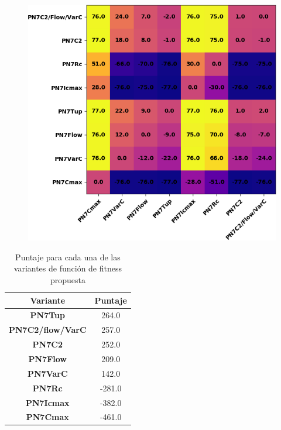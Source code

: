 \begin{figure}[h]
    \centering
    \includegraphics[scale=.8]{Imagenes/fitnesscomp.png}
    \label{fig:fcomp}
\end{figure}
\begin{table}[h]
    \centering
\begin{tabular}{@{}cc@{}}
Variante & Puntaje \\ \midrule
\toprule
    \textbf{PN7Tup} & 264.0 \\ \midrule
    \textbf{PN7C2/flow/VarC} & 257.0 \\ \midrule
    \textbf{PN7C2} & 252.0 \\ \midrule
    \textbf{PN7Flow} & 209.0 \\ \midrule
    \textbf{PN7VarC} & 142.0 \\ \midrule
    \textbf{PN7Rc} & -281.0 \\ \midrule
    \textbf{PN7Icmax} & -382.0 \\ \midrule
    \textbf{PN7Cmax} & -461.0 \\ \midrule
\end{tabular}
    \caption{Puntaje para cada una de las variantes de función de fitness propuesta}
    \label{tab:fcomp}
\end{table}

